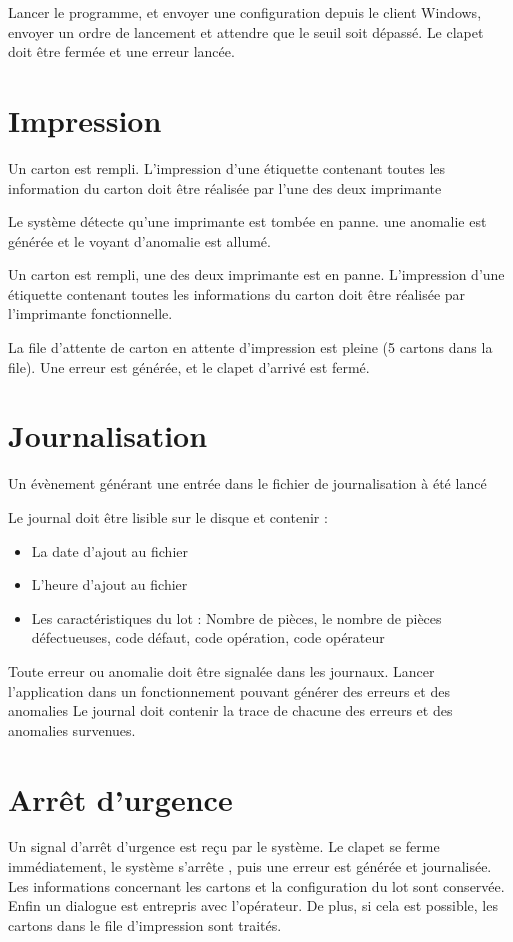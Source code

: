 {Lancer le programme, et envoyer une configuration depuis le client Windows, envoyer un ordre de lancement
et attendre que le seuil soit dépassé.}
{Le clapet doit être fermée et une erreur lancée.}

\section{Impression}
{Un carton est rempli.}
{L'impression d'une étiquette contenant toutes les information du carton doit être réalisée par l'une des deux imprimante}

{Le système détecte qu'une imprimante est tombée en panne.}
{une anomalie est générée et le voyant d'anomalie est allumé.}

{Un carton est rempli, une des deux imprimante est en panne.}
{L'impression d'une étiquette contenant toutes les informations du carton doit être réalisée par l'imprimante fonctionnelle. }

{La file d'attente de carton en attente d'impression est pleine (5 cartons dans la file).}
{Une erreur est générée, et le clapet d'arrivé est fermé.}

\section{Journalisation}
{Un évènement générant une entrée dans le fichier de journalisation à été lancé}
{Le journal doit être lisible sur le disque et contenir :
\begin{itemize}
	\item La date d'ajout au fichier 
	\item L'heure d'ajout au fichier
	\item Les caractéristiques du lot : Nombre de pièces, le nombre de pièces défectueuses, code défaut, code opération, code opérateur
\end{itemize}
}

{Toute erreur ou anomalie doit être signalée dans les journaux.}
{Lancer l'application dans un fonctionnement pouvant générer des erreurs et des anomalies}
{Le journal doit contenir la trace de chacune des erreurs et des anomalies survenues.}

\section{Arrêt d'urgence}
{Un signal d'arrêt d'urgence est reçu par le système.}
{Le clapet se ferme immédiatement, le système s'arrête , puis une erreur est générée et journalisée. Les informations concernant les cartons et la configuration du lot sont conservée.
Enfin un dialogue est entrepris avec l'opérateur. De plus, si cela est possible, les cartons dans le file d'impression sont traités.}

